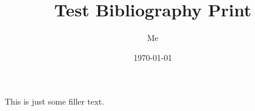 \documentclass{article}
\title{Test Bibliography Print}
\author{Me}
\date{\today}
\begin{document}
\maketitle
This is just some filler text.\cite{caro1975power}
\nocite{*} %
\printbibliography
\end{document}
